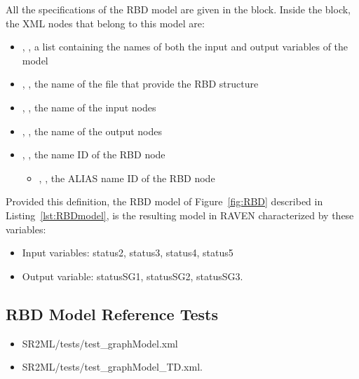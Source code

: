 All the specifications of the RBD model are given in the
 block.
Inside the  block, the XML
nodes that belong to this model are:
\begin{itemize}
  \item  {}, , a list containing the names of both the input and output variables of the model
  \item  {}, , the name of the file that provide the RBD structure
  \item  {}, , the name of the input nodes
  \item  {}, , the name of the output nodes
  \item  {}, , the name ID of the RBD node
	  \begin{itemize}
	    \item {}, , the ALIAS name ID of the RBD node
	  \end{itemize}
\end{itemize}

Provided this definition, the RBD model of Figure~\ref{fig:RBD} described in Listing~\ref{lst:RBDmodel},
is the resulting model in RAVEN characterized by these variables:
\begin{itemize}
	\item Input variables: status2, status3, status4, status5
	\item Output variable: statusSG1, statusSG2, statusSG3.
\end{itemize}

\subsection{RBD Model Reference Tests}
\begin{itemize}
	\item SR2ML/tests/test\_graphModel.xml
	\item SR2ML/tests/test\_graphModel\_TD.xml.
\end{itemize}
